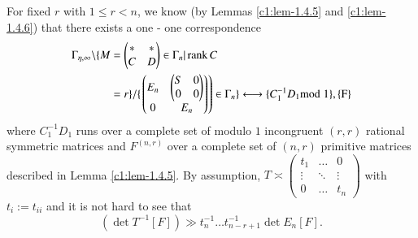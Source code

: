 For fixed $r$ with $1\leq r<n$, we know (by Lemmas \ref{c1:lem-1.4.5} and
\ref{c1:lem-1.4.6}) that there exists a one - one correspondence
\begin{align*}
\Gamma_{\eta,\infty}\backslash \{M &=
\begin{pmatrix}
\ast & \ast\\
C & D
\end{pmatrix}
\in\Gamma_{n}|\operatorname{rank} C\\&
=r\}/\{
\left.
\begin{pmatrix}
E_{n} & \begin{pmatrix}
       S & 0\\
       0 & 0
\end{pmatrix}\\
0 & E_{n}
\end{pmatrix}
\right)
\in\Gamma_{n}\}\longleftrightarrow \{C^{-1}_{1}D_{1}\rm{mod} \; 1\},\{F\}
\end{align*}
where $C^{-1}_{1}D_{1}$ runs over a complete set of modulo $1$
incongruent $(r,r)$ rational symmetric matrices and $F^{(n,r)}$ over a
complete set of $(n,r)$ primitive matrices described in Lemma
\ref{c1:lem-1.4.5}. By assumption, $T\asymp \left(\begin{smallmatrix}
  t_{1} & \ldots & 0\\ \vdots & \ddots & \vdots\\ 0 & \ldots & t_{n}
\end{smallmatrix}\right)$ with $t_{i}:=t_{ii}$ and it is not hard to
see that 
$$(\det T^{-1}[F])\gg t^{-1}_{n}\ldots t^{-1}_{n-r+1}\det
E_{n}[F].$$

